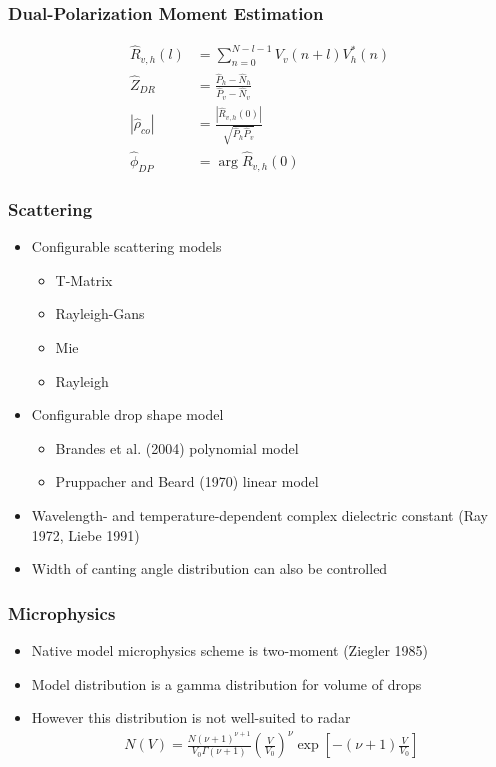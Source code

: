 \documentclass[red]{beamer}
\begin{document}
\begin{frame}
	\frametitle {Dual-Polarization Moment Estimation}
	\begin{align}
	    \hat{R}_{v,h}(l) &= \sum_{n=0}^{N-l-1} V_{v}(n+l) V_{h}^*(n) \\
	    \hat{Z}_{DR} & = \frac{\hat{P}_h - \hat{N}_h}{\hat{P}_v - \hat{N}_v} \\
	    |\hat{\rho}_{co}| &= \frac{|\hat{R}_{v,h}(0)|}{\sqrt{\hat{P}_h\hat{P}_v}} \\
	    \hat{\phi}_{DP} &= \arg{\hat{R}_{v,h}(0)}
	\end{align}
\end{frame}

\begin{frame}
	\frametitle{Scattering}
	\begin{itemize}
		\item Configurable scattering models
		\begin{itemize}
			\item T-Matrix
			\item Rayleigh-Gans
			\item Mie
			\item Rayleigh
			\end{itemize}
		\item Configurable drop shape model
		\begin{itemize}
			\item Brandes et al. (2004) polynomial model
			\item Pruppacher and Beard (1970) linear model
			\end{itemize}
		\item Wavelength- and temperature-dependent complex dielectric constant (Ray 1972, Liebe 1991)
		\item Width of canting angle distribution can also be controlled
	\end{itemize}
\end{frame}

\begin{frame}[<+->]
	\frametitle{Microphysics}
	\begin{itemize}
		\item Native model microphysics scheme is two-moment (Ziegler 1985)
		\item Model distribution is a gamma distribution for volume of drops
		\item However this distribution is not well-suited to radar
		\begin{align}
			N(V) = \frac{N (\nu + 1)^{\nu + 1}}{V_0 \Gamma(\nu + 1)}
        \left(\frac{V}{V_0}\right)^{\nu}
        \exp\left[{-(\nu + 1) \frac{V}{V_0}}\right]
		\end{align}
	\end{itemize}
\end{frame}
\end{document}
